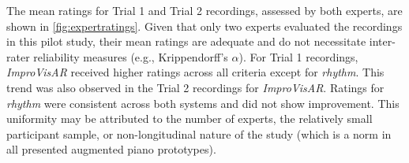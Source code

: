 \documentclass{vgtc}                          %
\begin{document}
\par %
The mean ratings for Trial 1 and Trial 2 recordings, assessed by both experts, are shown in \autoref{fig:expertratings}. Given that only two experts evaluated the recordings in this pilot study, their mean ratings are adequate and do not necessitate inter-rater reliability measures (e.g., Krippendorff's $\alpha$). For Trial 1 recordings, \textit{ImproVisAR} received higher ratings across all criteria except for \textit{rhythm}. This trend was also observed in the Trial 2 recordings for \textit{ImproVisAR}. Ratings for \textit{rhythm} were consistent across both systems and did not show improvement. This uniformity may be attributed to the number of experts, the relatively small participant sample, or non-longitudinal nature of the study (which is a norm in all presented augmented piano prototypes).
\end{document}
